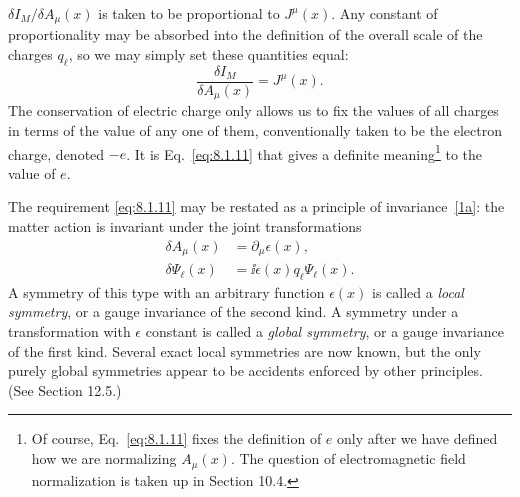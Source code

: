$\delta I_M/\delta A_\mu(x)$ is taken to be proportional to $J^\mu(x)$. Any
constant of proportionality may be absorbed into the definition of the
overall scale of the charges $q_\ell$, so we may simply set these quantities
equal:
\begin{equation}
  \frac{\delta I_M}{\delta A_\mu(x)}=J^\mu(x).
  \tag{8.1.11}\label{eq:8.1.11}
\end{equation}
The conservation of electric charge only allows us to fix the values of all
charges in terms of the value of any one of them, conventionally taken to
be the electron charge, denoted $-e$. It is Eq.~\eqref{eq:8.1.11} that gives a definite
meaning\footnote{Of course, Eq.~\eqref{eq:8.1.11} fixes the definition of $e$ only after
we have defined how we are normalizing $A_\mu(x)$. The question of
electromagnetic field normalization is taken up in Section 10.4.} to the value
of $e$.

The requirement \eqref{eq:8.1.11} may be restated as a principle of invariance~\hyperref[ref:8.1a]{[1a]}:
the matter action is invariant under the joint transformations
\begin{align}
  \delta A_\mu(x)&=\partial_\mu\epsilon(x),
  \tag{8.1.12}\label{eq:8.1.12}\\
  \delta\Psi_\ell(x)&=\ii\epsilon(x)q_\ell\Psi_\ell(x).
  \tag{8.1.13}\label{eq:8.1.13}
\end{align}
A symmetry of this type with an arbitrary function $\epsilon(x)$ is called a
\textit{local symmetry}, or a gauge invariance of the second kind. A symmetry
under a transformation with $\epsilon$ constant is called a \textit{global
symmetry}, or a gauge invariance of the first kind. Several exact local
symmetries are now known, but the only purely global symmetries appear to be
accidents enforced by other principles. (See Section 12.5.)

